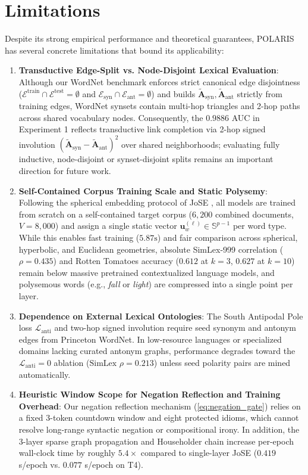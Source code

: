 \documentclass[journal]{IEEEtran}
\begin{document}
\section{Limitations}
Despite its strong empirical performance and theoretical guarantees, POLARIS has several concrete limitations that bound its applicability:
\begin{enumerate}
    \item \textbf{Transductive Edge-Split vs. Node-Disjoint Lexical Evaluation}: Although our WordNet benchmark enforces strict canonical edge disjointness ($\mathcal{E}^{\text{train}} \cap \mathcal{E}^{\text{test}} = \emptyset$ and $\mathcal{E}_{\text{syn}} \cap \mathcal{E}_{\text{ant}} = \emptyset$) and builds $\tilde{\mathbf{A}}_{\text{syn}}, \tilde{\mathbf{A}}_{\text{ant}}$ strictly from training edges, WordNet synsets contain multi-hop triangles and 2-hop paths across shared vocabulary nodes. Consequently, the $0.9886$ AUC in Experiment 1 reflects transductive link completion via 2-hop signed involution $(\tilde{\mathbf{A}}_{\text{syn}} - \tilde{\mathbf{A}}_{\text{ant}})^2$ over shared neighborhoods; evaluating fully inductive, node-disjoint or synset-disjoint splits remains an important direction for future work.
    \item \textbf{Self-Contained Corpus Training Scale and Static Polysemy}: Following the spherical embedding protocol of JoSE \cite{meng2019spherical}, all models are trained from scratch on a self-contained target corpus ($6,200$ combined documents, $V = 8,000$) and assign a single static vector $\mathbf{u}_w^{(\ell)} \in \mathbb{S}^{p-1}$ per word type. While this enables fast training ($5.87\text{s}$) and fair comparison across spherical, hyperbolic, and Euclidean geometries, absolute SimLex-999 correlation ($\rho = 0.435$) and Rotten Tomatoes accuracy ($0.612$ at $k=3$, $0.627$ at $k=10$) remain below massive pretrained contextualized language models, and polysemous words (e.g., \textit{fall} or \textit{light}) are compressed into a single point per layer.
    \item \textbf{Dependence on External Lexical Ontologies}: The South Antipodal Pole loss $\mathcal{L}_{\text{anti}}$ and two-hop signed involution require seed synonym and antonym edges from Princeton WordNet. In low-resource languages or specialized domains lacking curated antonym graphs, performance degrades toward the $\mathcal{L}_{\text{anti}} = 0$ ablation ($\text{SimLex } \rho = 0.213$) unless seed polarity pairs are mined automatically.
    \item \textbf{Heuristic Window Scope for Negation Reflection and Training Overhead}: Our negation reflection mechanism (\ref{eq:negation_gate}) relies on a fixed 3-token countdown window and eight protected idioms, which cannot resolve long-range syntactic negation or compositional irony. In addition, the 3-layer sparse graph propagation and Householder chain increase per-epoch wall-clock time by roughly $5.4\times$ compared to single-layer JoSE ($0.419$ s/epoch vs. $0.077$ s/epoch on T4).
\end{enumerate}
\end{document}
